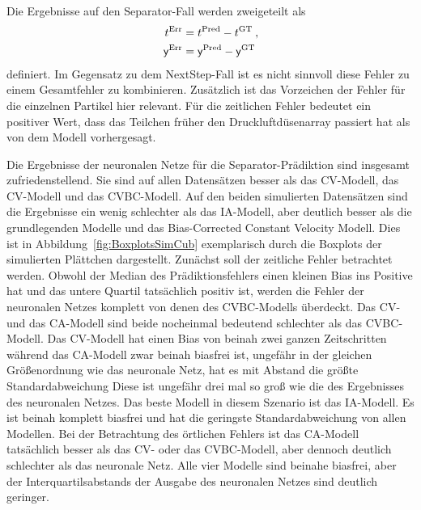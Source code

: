 Die Ergebnisse auf den Separator-Fall werden zweigeteilt als
\begin{align*}
    t{^{\text{Err}}} &=  t{^{\text{Pred}}} -  t{^{\text{GT}}} \: ,\\
    \mathsf{y}{^{\text{Err}}} &=  \mathsf{y}{^{\text{Pred}}} -  \mathsf{y}{^{\text{GT}}}
\end{align*}
definiert.
Im Gegensatz zu dem NextStep-Fall ist es nicht sinnvoll diese Fehler zu einem Gesamtfehler zu kombinieren.
Zusätzlich ist das Vorzeichen der Fehler für die einzelnen Partikel hier relevant.
Für die zeitlichen Fehler bedeutet ein positiver Wert, 
dass das Teilchen früher den Druckluftdüsenarray passiert hat als von dem Modell vorhergesagt. 


Die Ergebnisse der neuronalen Netze für die Separator-Prädiktion sind insgesamt zufriedenstellend.
Sie sind auf allen Datensätzen besser als das CV-Modell, das CV-Modell und das CVBC-Modell.
Auf den beiden simulierten Datensätzen sind die Ergebnisse ein wenig schlechter als das IA-Modell, 
aber deutlich besser als die grundlegenden Modelle und das Bias-Corrected Constant Velocity Modell.
Dies ist in Abbildung~\ref{fig:BoxplotsSimCub} exemplarisch durch die Boxplots der simulierten Plättchen dargestellt.
Zunächst soll der zeitliche Fehler betrachtet werden.
Obwohl der Median des Prädiktionsfehlers einen kleinen Bias ins Positive hat und das untere Quartil tatsächlich positiv ist, werden die Fehler der neuronalen Netzes komplett von denen des CVBC-Modells überdeckt.
Das CV- und das CA-Modell sind beide nocheinmal bedeutend schlechter als das CVBC-Modell.
Das CV-Modell hat einen Bias von beinah zwei ganzen Zeitschritten während das CA-Modell zwar beinah biasfrei ist, ungefähr in der gleichen Größenordnung wie das neuronale Netz, hat es mit Abstand die größte Standardabweichung
Diese ist ungefähr drei mal so groß wie die des Ergebnisses des neuronalen Netzes.
Das beste Modell in diesem Szenario ist das IA-Modell.
Es ist beinah komplett biasfrei und hat die geringste Standardabweichung von allen Modellen.
Bei der Betrachtung des örtlichen Fehlers ist das CA-Modell tatsächlich besser als das CV- oder das CVBC-Modell, aber dennoch deutlich schlechter als das neuronale Netz.
Alle vier Modelle sind beinahe biasfrei, aber der Interquartilsabstands der Ausgabe des neuronalen Netzes sind deutlich geringer. 

